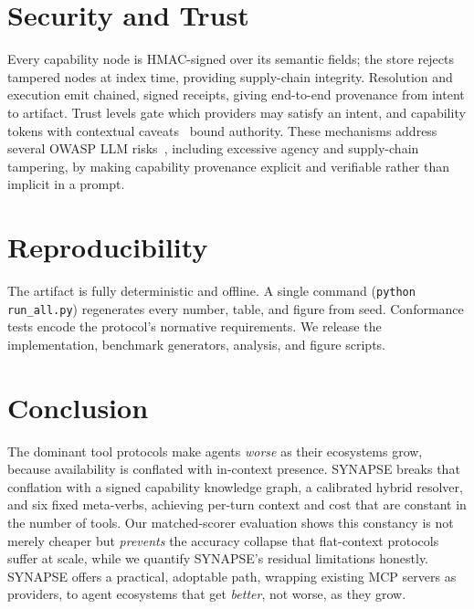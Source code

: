 \documentclass[11pt]{article}
\theoremstyle{plain}
\theoremstyle{definition}
\begin{document}
\section{Security and Trust}
Every capability node is HMAC-signed over its semantic fields; the store rejects
tampered nodes at index time, providing supply-chain integrity. Resolution and
execution emit chained, signed receipts, giving end-to-end provenance from intent
to artifact. Trust levels gate which providers may satisfy an intent, and
capability tokens with contextual caveats~\citep{birgersson2016macaroons} bound
authority. These mechanisms address several OWASP LLM risks~\citep{owasp_llm_2025},
including excessive agency and supply-chain tampering, by making capability
provenance explicit and verifiable rather than implicit in a prompt.

\section{Reproducibility}
The artifact is fully deterministic and offline. A single command
(\texttt{python run\_all.py}) regenerates every number, table, and figure from
seed. Conformance tests encode the protocol's normative requirements. We release
the implementation, benchmark generators, analysis, and figure scripts.

\section{Conclusion}
The dominant tool protocols make agents \emph{worse} as their ecosystems grow,
because availability is conflated with in-context presence. SYNAPSE breaks that
conflation with a signed capability knowledge graph, a calibrated hybrid
resolver, and six fixed meta-verbs, achieving per-turn context and cost that are
constant in the number of tools. Our matched-scorer evaluation shows this
constancy is not merely cheaper but \emph{prevents} the accuracy collapse that
flat-context protocols suffer at scale, while we quantify SYNAPSE's residual
limitations honestly. SYNAPSE offers a practical, adoptable path, wrapping
existing MCP servers as providers, to agent ecosystems that get \emph{better},
not worse, as they grow.

\appendix
\end{document}
